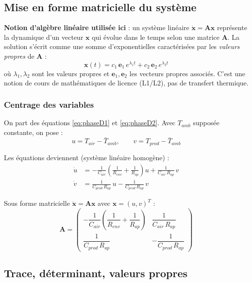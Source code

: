 \documentclass[11pt,a4paper]{article}
\begin{document}
\subsection{Mise en forme matricielle du système}

\begin{rappel}
\textbf{Notion d'algèbre linéaire utilisée ici} : un système linéaire $\dot{\mathbf{x}} =
\mathbf{A}\mathbf{x}$ représente la dynamique d'un vecteur $\mathbf{x}$ qui évolue dans le
temps selon une matrice $\mathbf{A}$. La solution s'écrit comme une somme d'exponentielles
caractérisées par les \emph{valeurs propres} de $\mathbf{A}$ :
$$\mathbf{x}(t) = c_1\,\mathbf{e}_1\,e^{\lambda_1 t} + c_2\,\mathbf{e}_2\,e^{\lambda_2 t}$$
où $\lambda_1, \lambda_2$ sont les valeurs propres et $\mathbf{e}_1, \mathbf{e}_2$ les
vecteurs propres associés. C'est une notion de cours de mathématiques de licence (L1/L2),
pas de transfert thermique.
\end{rappel}

\subsubsection*{Centrage des variables}

On part des équations \eqref{eq:phaseD1} et \eqref{eq:phaseD2}. Avec $T_{amb}$ supposée
constante, on pose :
$$u = T_{air} - \bar T_{amb}, \qquad v = T_{prod} - \bar T_{amb}$$

Les équations deviennent (système linéaire homogène) :
\begin{align}
\dot u &= -\frac{1}{C_{air}}\!\left(\frac{1}{R_{env}}+\frac{1}{R_{ap}}\right)\!u + \frac{1}{C_{air}\,R_{ap}}\,v\\
\dot v &= \frac{1}{C_{prod}\,R_{ap}}\,u - \frac{1}{C_{prod}\,R_{ap}}\,v
\end{align}

Sous forme matricielle $\dot{\mathbf{x}} = \mathbf{A}\mathbf{x}$ avec $\mathbf{x} = (u,v)^T$ :
\begin{equation}
\mathbf{A} = \begin{pmatrix}
-\dfrac{1}{C_{air}}\!\left(\dfrac{1}{R_{env}}+\dfrac{1}{R_{ap}}\right) & \dfrac{1}{C_{air}\,R_{ap}}\\[0.6em]
\dfrac{1}{C_{prod}\,R_{ap}} & -\dfrac{1}{C_{prod}\,R_{ap}}
\end{pmatrix}
\end{equation}

\subsection{Trace, déterminant, valeurs propres}
\end{document}
